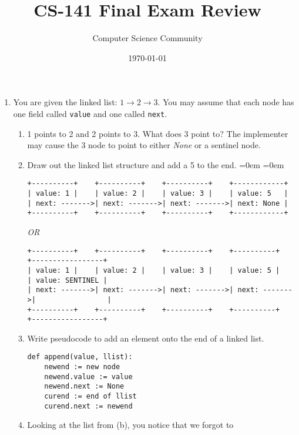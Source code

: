\documentclass[11pt]{article}
\author{Computer Science Community}
\title{CS-141 Final Exam Review}
\date{\today}
\newenvironment{answer}{\large\lstset{basicstyle=\large}\color{white}}{}
\newenvironment{answer}{\large\lstset{basicstyle=\large}\color{red}}{}
\begin{document}
\header

\begin{enumerate}


    \item You are given the linked list: $1 \rightarrow 2 \rightarrow 3$.  You may assume that each node has one field called \texttt{value} and one called \texttt{next}.
        \begin{enumerate}
            \item 1 points to 2 and 2 points to 3. What does 3 point to?
                \begin{answer}
				The implementer may cause the 3 node to point to either \textit{None} or a sentinel node.
				\end{answer}
            \item Draw out the linked list structure and add a 5 to the end.
				\begin{answer}
				\leftmargin=0em
				\itemindent=0em
				{ \small
				\begin{verbatim}
+----------+    +----------+    +----------+    +------------+
| value: 1 |    | value: 2 |    | value: 3 |    | value: 5   |
| next: ------->| next: ------->| next: ------->| next: None |
+----------+    +----------+    +----------+    +------------+
				\end{verbatim}
				\textit{OR}
				\begin{verbatim}
+----------+    +----------+    +----------+    +----------+    +-----------------+
| value: 1 |    | value: 2 |    | value: 3 |    | value: 5 |    | value: SENTINEL |
| next: ------->| next: ------->| next: ------->| next: ------->|                 |
+----------+    +----------+    +----------+    +----------+    +-----------------+
				\end{verbatim} }
				\end{answer}
            \item Write pseudocode to add an element onto the end of a linked list.
				\begin{answer}
				\begin{lstlisting}
def append(value, llist):
	newend := new node
	newend.value := value
	newend.next := None
	curend := end of llist
	curend.next := newend
				\end{lstlisting}
				\end{answer}
            \pagebreak
            \item Looking at the list from (b), you notice that we forgot to

\end{enumerate}
\end{enumerate}
\end{document}
